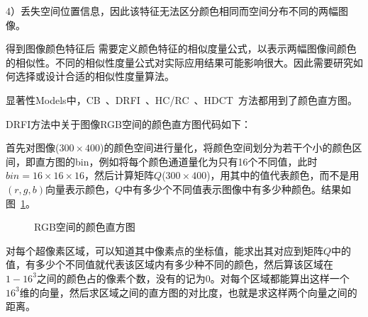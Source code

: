 \documentclass[12pt]{article}
\begin{document}
4）丢失空间位置信息，因此该特征无法区分颜色相同而空间分布不同的两幅图像。

得到图像颜色特征后 需要定义颜色特征的相似度量公式，以表示两幅图像间颜色的相似性。不同的相似性度量公式对实际应用结果可能影响很大。因此需要研究如何选择或设计合适的相似性度量算法。

显著性Models中，CB~\cite{jiang2011automatic}、DRFI~\cite{jianghuaizu2013salient}、HC/RC~\cite{cheng2011global}、HDCT~\cite{kim2014salient}方法都用到了颜色直方图。

DRFI方法中关于图像RGB空间的颜色直方图代码如下：



首先对图像($300 \times 400$)的颜色空间进行量化，将颜色空间划分为若干个小的颜色区间，即直方图的bin，例如将每个颜色通道量化为只有16个不同值，此时$bin = 16 \times 16 \times 16$，然后计算矩阵$Q$($300 \times 400$)，用其中的值代表颜色，而不是用$(r, g, b)$向量表示颜色，$Q$中有多少个不同值表示图像中有多少种颜色。结果如图~\ref{fig: RGBhistogram}。

\begin{figure}
  \centering 
  \caption{RGB空间的颜色直方图}
  \label{fig: RGBhistogram} %
\end{figure}

对每个超像素区域，可以知道其中像素点的坐标值，能求出其对应到矩阵$Q$中的值，有多少个不同值就代表该区域内有多少种不同的颜色，然后算该区域在$1-16^3$之间的颜色占的像素个数，没有的记为0。对每个区域都能算出这样一个$16^3$维的向量，然后求区域之间的直方图的对比度，也就是求这样两个向量之间的距离。
\end{document}
